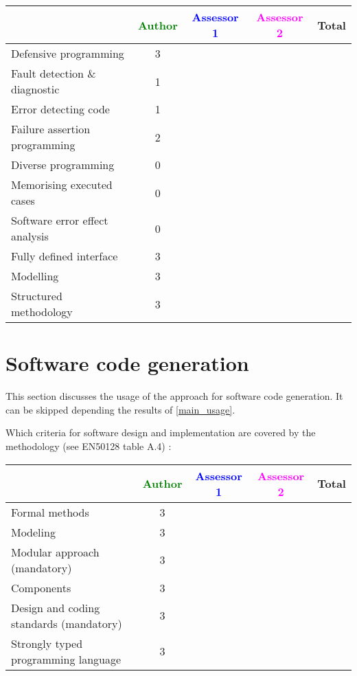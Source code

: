 \begin{tabular}{|l | c | c | c | c|}
\hline
& \textcolor{green}{Author} & \textcolor{blue}{Assessor 1} & \textcolor{magenta}{Assessor 2} & Total \\
\hline
Defensive programming  & 3 & & &  \\
\hline 
Fault detection \& diagnostic  & 1 & & &  \\
\hline
Error detecting code  & 1 & & &  \\
\hline
Failure assertion programming & 2  & & &  \\
\hline
Diverse programming & 0 & & &  \\
\hline
Memorising executed cases & 0 & & &  \\
\hline
Software error effect analysis & 0 & & &  \\
\hline
Fully defined interface & 3 & & &  \\
\hline
Modelling  & 3 & & &  \\
\hline
Structured methodology & 3 & & &  \\
\hline
\end{tabular}

\section{Software code generation}
This section discusses the usage of the approach for software code generation.
It can be skipped depending the results of \ref{main_usage}.

Which criteria for software design and implementation are covered by the methodology
(see EN50128 table A.4) :

\begin{tabular}{|l | c | c | c | c|}
\hline
& \textcolor{green}{Author} & \textcolor{blue}{Assessor 1} & \textcolor{magenta}{Assessor 2} & Total \\
\hline
Formal methods  & 3 & & &  \\
\hline 
Modeling  & 3 & & &  \\
\hline
Modular approach (mandatory) & 3 & & &  \\
\hline
Components & 3 & & &  \\
\hline
Design and coding standards (mandatory) & 3 & & &  \\
\hline
Strongly typed programming language & 3 & & &  \\
\hline

\end{tabular}



